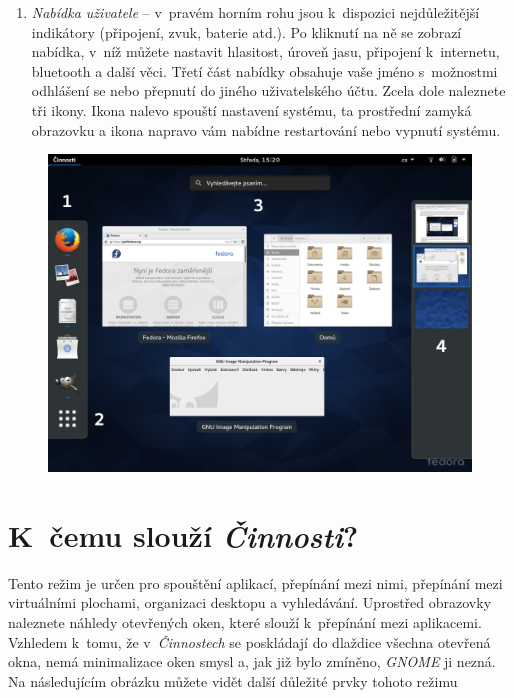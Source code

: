 \begin{enumerate}
\item\emph{Nabídka uživatele} -- v~pravém horním rohu jsou k~dispozici nejdůležitější indikátory (připojení, zvuk, baterie atd.). Po kliknutí na ně se zobrazí nabídka, v~níž můžete nastavit hlasitost, úroveň jasu, připojení k~internetu, bluetooth a další věci. Třetí část nabídky obsahuje vaše jméno s~možnostmi odhlášení se nebo přepnutí do jiného uživatelského účtu. Zcela dole naleznete tři ikony. Ikona nalevo spouští nastavení systému, ta prostřední zamyká obrazovku a ikona napravo vám nabídne restartování nebo vypnutí systému.
\end{enumerate}

\begin{figure}[t]
\begin{center}
\includegraphics[width=\textwidth]{img/shell-b}
 \label{fig:shell-b}
\end{center}
\end{figure}

\section*{K~čemu slouží \emph{Činnosti}?}
Tento režim je určen pro spouštění aplikací, přepínání mezi nimi, přepínání mezi virtuálními plochami, organizaci desktopu a vyhledávání. Uprostřed obrazovky naleznete náhledy otevřených oken, které slouží k~přepínání mezi aplikacemi. Vzhledem k~tomu, že v~\emph{Činnostech} se poskládají do dlaždice všechna otevřená okna, nemá minimalizace oken smysl a, jak již bylo zmíněno, \emph{GNOME} ji nezná. Na následujícím obrázku můžete vidět další důležité prvky tohoto režimu

